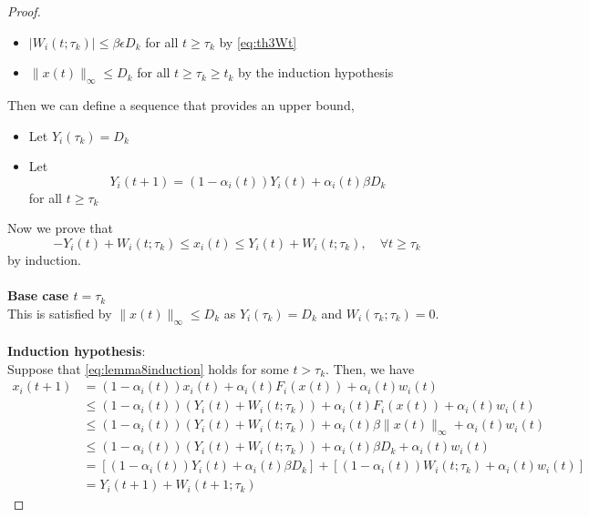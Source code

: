 \begin{proof}
\begin{itemize}
        \item $|W_i(t;\tau_k)|\le \beta\epsilon D_k$ for all $t\ge \tau_k$ by \autoref{eq:th3Wt}\\
        \item $\|x(t)\|_\infty \le D_k$ for all $t\ge \tau_k\ge t_k$ by the induction hypothesis
    \end{itemize}
    Then we can define a sequence that provides an upper bound, 
    \begin{itemize}
        \item Let $Y_i(\tau_k) = D_k$
        \item Let 
        \begin{equation}\label{eq:Yrecusive}
            Y_i(t+1) = (1-\alpha_i(t))Y_i(t)+\alpha_i(t)\beta D_k
        \end{equation}
        for all $t\ge \tau_k$
    \end{itemize}
    Now we prove that 
    \begin{equation}\label{eq:lemma8induction}
     -Y_i(t) + W_i(t;\tau_k)\le x_i(t)\le Y_i(t) + W_i(t;\tau_k),\quad \forall t\ge \tau_k   
    \end{equation}
    by induction.\\
    \\
    \textbf{Base case $t= \tau_k$}\\
    This is satisfied by $\|x(t)\|_\infty \le D_k$ as $Y_i(\tau_k)=D_k$ and $W_i(\tau_k;\tau_k)=0$.\\
    \\
    \textbf{Induction hypothesis}:\\
    Suppose that \autoref{eq:lemma8induction} holds for some $t>\tau_k$. Then, we have
    \begin{align*}
         x_i(t+1) &= (1-\alpha_i(t))x_i(t) + \alpha_i(t)F_i(x(t)) + \alpha_i(t)w_i(t)\\
         &\le (1-\alpha_i(t))(Y_i(t) + W_i(t;\tau_k)) + \alpha_i(t)F_i(x(t)) + \alpha_i(t)w_i(t)\tag{Induction}\\
         &\le (1-\alpha_i(t))(Y_i(t) + W_i(t;\tau_k)) + \alpha_i(t)\beta\|x(t)\|_\infty + \alpha_i(t)w_i(t)\tag{Assumption 3}\\
         &\le (1-\alpha_i(t))(Y_i(t) + W_i(t;\tau_k)) + \alpha_i(t)\beta D_k + \alpha_i(t)w_i(t)\tag{$\|x(t)\|_\infty \le D_k$}\\
         & =[(1-\alpha_i(t))Y_i(t) + \alpha_i(t)\beta D_k] + [(1-\alpha_i(t)) W_i(t;\tau_k) + \alpha_i(t)w_i(t)]\\
         &= Y_i(t+1) + W_i(t+1;\tau_k)

\end{align*}
\end{proof}
